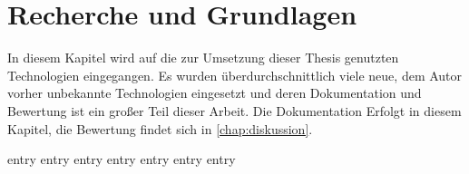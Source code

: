 \chapter{Recherche und Grundlagen}
\label{chap:grundlagen}

In diesem Kapitel wird auf die zur Umsetzung dieser Thesis genutzten
Technologien eingegangen.  Es wurden überdurchschnittlich viele neue, dem Autor
vorher unbekannte Technologien eingesetzt und deren Dokumentation und Bewertung
ist ein großer Teil dieser Arbeit.  Die Dokumentation Erfolgt in diesem
Kapitel, die Bewertung findet sich in \cref{chap:diskussion}.

{entry}
{entry}
{entry}
{entry}
{entry}
{entry}
{entry}
